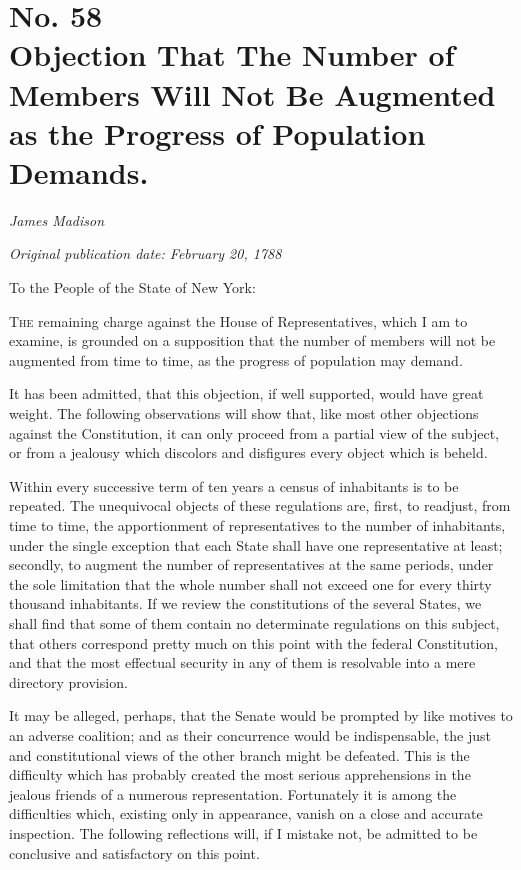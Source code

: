 \chapter[No. 58: Objection That The Number of Members Will Not Be Augmented as the Progress of Population Demands.]{No. 58\\ {\small Objection That The Number of Members Will Not Be Augmented as the Progress of Population Demands.}}

\textit{James Madison}

\textit{Original publication date: February 20, 1788}
\vspace{1cm}

To the People of the State of New York:
\vspace{.4cm}

\textsc{The} remaining charge against the House of Representatives, which I am to examine, is grounded on a supposition that the number of members will not be augmented from time to time, as the progress of population may demand.

It has been admitted, that this objection, if well supported, would have great weight. 
The following observations will show that, like most other objections against the Constitution, it can only proceed from a partial view of the subject, or from a jealousy which discolors and disfigures every object which is beheld.

Within every successive term of ten years a census of inhabitants is to be repeated. 
The unequivocal objects of these regulations are, first, to readjust, from time to time, the apportionment of representatives to the number of inhabitants, under the single exception that each State shall have one representative at least; secondly, to augment the number of representatives at the same periods, under the sole limitation that the whole number shall not exceed one for every thirty thousand inhabitants. 
If we review the constitutions of the several States, we shall find that some of them contain no determinate regulations on this subject, that others correspond pretty much on this point with the federal Constitution, and that the most effectual security in any of them is resolvable into a mere directory provision.

It may be alleged, perhaps, that the Senate would be prompted by like motives to an adverse coalition; and as their concurrence would be indispensable, the just and constitutional views of the other branch might be defeated. 
This is the difficulty which has probably created the most serious apprehensions in the jealous friends of a numerous representation. 
Fortunately it is among the difficulties which, existing only in appearance, vanish on a close and accurate inspection. 
The following reflections will, if I mistake not, be admitted to be conclusive and satisfactory on this point.

